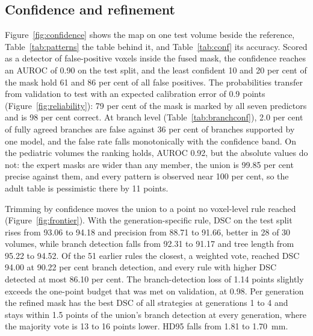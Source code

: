 \documentclass[runningheads]{llncs}
\begin{document}
\subsection{Confidence and refinement}
\label{sec:res-confidence}
Figure~\ref{fig:confidence} shows the map on one test volume beside the
reference, Table~\ref{tab:patterns} the table behind it, and
Table~\ref{tab:conf} its accuracy. Scored as a detector of
false-positive voxels inside the fused mask, the confidence reaches an AUROC
of 0.90 on the test split, and the least confident 10 and 20 per cent of the
mask hold 61 and 86 per cent of all false positives. The probabilities
transfer from validation to test with an expected calibration error of 0.9
points (Figure~\ref{fig:reliability}): 79 per cent of the mask is marked by
all seven predictors and is 98 per cent correct. At branch level
(Table~\ref{tab:branchconf}), 2.0 per cent of fully agreed branches are false
against 36 per cent of branches supported by one model, and the false rate
falls monotonically with the confidence band. On the pediatric volumes the ranking holds, AUROC 0.92, but the
absolute values do not: the expert masks are wider than any member, the union
is 99.85 per cent precise against them, and every pattern is observed near
100 per cent, so the adult table is pessimistic there by 11 points.

Trimming by confidence moves the union to a point no voxel-level rule reached
(Figure~\ref{fig:frontier}). With the generation-specific rule, DSC on the
test split rises from 93.06 to 94.18 and precision from 88.71 to 91.66,
better in 28 of 30 volumes, while branch detection falls from 92.31 to 91.17
and tree length from 95.22 to 94.52. Of the 51 earlier rules the closest,
a weighted vote, reached DSC 94.00 at 90.22 per cent branch detection, and
every rule with higher DSC detected at most 86.10 per cent. The branch-detection loss of 1.14
points slightly exceeds the one-point budget that was met on validation, at
0.98. Per generation the refined mask has the best DSC of all strategies at
generations 1 to 4 and stays within 1.5 points of the union's branch
detection at every generation, where the majority vote is 13 to 16 points
lower. HD95 falls from 1.81 to 1.70~mm.
\end{document}
